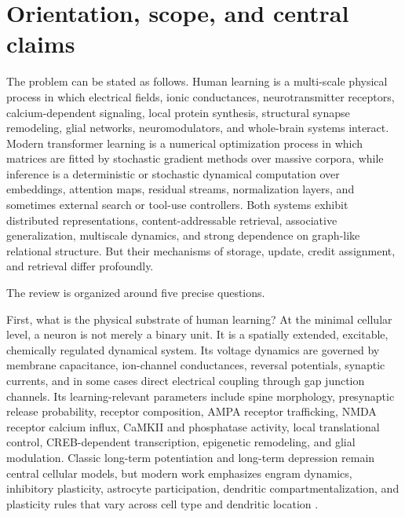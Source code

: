 \documentclass[11pt]{article}
\newcommand{\1}{\mathbf{1}}
\begin{document}
\begin{abstract}
UniProt features, biomolecular-complex affinity, PPI/contact records, all-atom unfolded coordinate templates with covalent bond edge tokens, two separate GFlowNet stages, resumable curation, integrity checks, and compact multimodal bio-scale graphification. Throughout the revised architecture, the primary target is an output graph: textual answers, SELFIES strings, proof traces, tool traces, thought graphs, generated coordinate hypotheses, and oracle-scored candidate records are serializations or renderings of typed graph states, not separate graph-to-sequence heads.
\end{abstract}

\tableofcontents
\newpage

\section{Orientation, scope, and central claims}

The problem can be stated as follows. Human learning is a multi-scale physical process in which electrical fields, ionic conductances, neurotransmitter receptors, calcium-dependent signaling, local protein synthesis, structural synapse remodeling, glial networks, neuromodulators, and whole-brain systems interact. Modern transformer learning is a numerical optimization process in which matrices are fitted by stochastic gradient methods over massive corpora, while inference is a deterministic or stochastic dynamical computation over embeddings, attention maps, residual streams, normalization layers, and sometimes external search or tool-use controllers. Both systems exhibit distributed representations, content-addressable retrieval, associative generalization, multiscale dynamics, and strong dependence on graph-like relational structure. But their mechanisms of storage, update, credit assignment, and retrieval differ profoundly.

The review is organized around five precise questions.

First, what is the physical substrate of human learning? At the minimal cellular level, a neuron is not merely a binary unit. It is a spatially extended, excitable, chemically regulated dynamical system. Its voltage dynamics are governed by membrane capacitance, ion-channel conductances, reversal potentials, synaptic currents, and in some cases direct electrical coupling through gap junction channels. Its learning-relevant parameters include spine morphology, presynaptic release probability, receptor composition, AMPA receptor trafficking, NMDA receptor calcium influx, CaMKII and phosphatase activity, local translational control, CREB-dependent transcription, epigenetic remodeling, and glial modulation. Classic long-term potentiation and long-term depression remain central cellular models, but modern work emphasizes engram dynamics, inhibitory plasticity, astrocyte participation, dendritic compartmentalization, and plasticity rules that vary across cell type and dendritic location \cite{BlissLomo1973,BiPoo1998,Hayashi2022,Nicoll2023,Choucry2024,Tome2024,Wright2025}.
\end{document}
